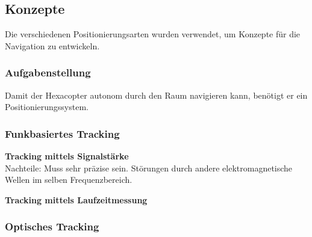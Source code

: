 \begin{itemize}
  \subsection{Konzepte}
  Die verschiedenen Positionierungsarten wurden verwendet, um Konzepte für die Navigation zu entwickeln.

    \subsubsection{Aufgabenstellung}
    Damit der Hexacopter autonom durch den Raum navigieren kann, benötigt er ein Positionierungssystem.

    \subsubsection{Funkbasiertes Tracking}

      \textbf{Tracking mittels Signalstärke}\\


      Nachteile:
      Muss sehr präzise sein.
      Störungen durch andere elektromagnetische Wellen im selben Frequenzbereich.



      \textbf{Tracking mittels Laufzeitmessung}\\





    \subsubsection{Optisches Tracking}



\end{itemize}
